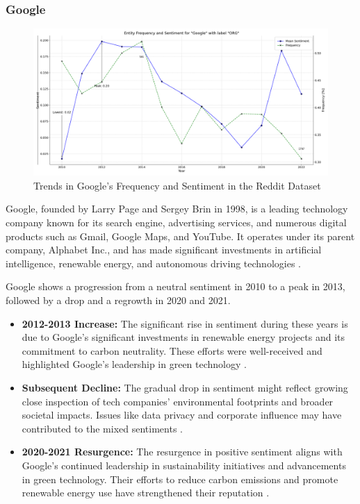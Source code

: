 \subsubsection{Google}
\begin{figure}[h]
    \includegraphics[width=\textwidth]{images/topic_details/entities/entity_frequency_Google.png}
    \caption{Trends in Google's Frequency and Sentiment in the Reddit Dataset}
    \label{fig:entity_google}
\end{figure}

Google, founded by Larry Page and Sergey Brin in 1998, is a leading technology company known for its search engine, advertising services, and numerous digital products such as Gmail, Google Maps, and YouTube. It operates under its parent company, Alphabet Inc., and has made significant investments in artificial intelligence, renewable energy, and autonomous driving technologies \cite{britannica2024}.

Google shows a progression from a neutral sentiment in 2010 to a peak in 2013, followed by a drop and a regrowth in 2020 and 2021.

\begin{itemize}
    \item \textbf{2012-2013 Increase:} The significant rise in sentiment during these years is due to Google's significant investments in renewable energy projects and its commitment to carbon neutrality. These efforts were well-received and highlighted Google's leadership in green technology \cite{wemeanbusiness2024,google2013}.
    \item \textbf{Subsequent Decline:} The gradual drop in sentiment might reflect growing close inspection of tech companies' environmental footprints and broader societal impacts. Issues like data privacy and corporate influence may have contributed to the mixed sentiments \cite{PENZ20181125}.
    \item \textbf{2020-2021 Resurgence:} The resurgence in positive sentiment aligns with Google's continued leadership in sustainability initiatives and advancements in green technology. Their efforts to reduce carbon emissions and promote renewable energy use have strengthened their reputation \cite{fastcompany2016}.
\end{itemize}

